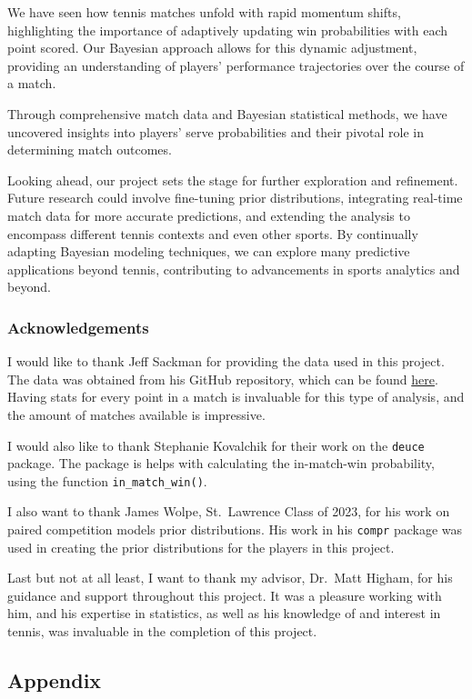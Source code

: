 \documentclass[
  letterpaper,
  DIV=11,
  numbers=noendperiod]{scrartcl}
\begin{document}
We have seen how tennis matches unfold with rapid momentum shifts,
highlighting the importance of adaptively updating win probabilities
with each point scored. Our Bayesian approach allows for this dynamic
adjustment, providing an understanding of players' performance
trajectories over the course of a match.

Through comprehensive match data and Bayesian statistical methods, we
have uncovered insights into players' serve probabilities and their
pivotal role in determining match outcomes.

Looking ahead, our project sets the stage for further exploration and
refinement. Future research could involve fine-tuning prior
distributions, integrating real-time match data for more accurate
predictions, and extending the analysis to encompass different tennis
contexts and even other sports. By continually adapting Bayesian
modeling techniques, we can explore many predictive applications beyond
tennis, contributing to advancements in sports analytics and beyond.

\subsubsection{Acknowledgements}\label{acknowledgements}

I would like to thank Jeff Sackman for providing the data used in this
project. The data was obtained from his GitHub repository, which can be
found \href{https://github.com/JeffSackmann}{here}. Having stats for
every point in a match is invaluable for this type of analysis, and the
amount of matches available is impressive.

I would also like to thank Stephanie Kovalchik for their work on the
\texttt{deuce} package. The package is helps with calculating the
in-match-win probability, using the function \texttt{in\_match\_win()}.

I also want to thank James Wolpe, St.~Lawrence Class of 2023, for his
work on paired competition models prior distributions. His work in his
\texttt{compr} package was used in creating the prior distributions for
the players in this project.

Last but not at all least, I want to thank my advisor, Dr.~Matt Higham,
for his guidance and support throughout this project. It was a pleasure
working with him, and his expertise in statistics, as well as his
knowledge of and interest in tennis, was invaluable in the completion of
this project.

\subsection{Appendix}\label{sec-appendix}
\end{document}

